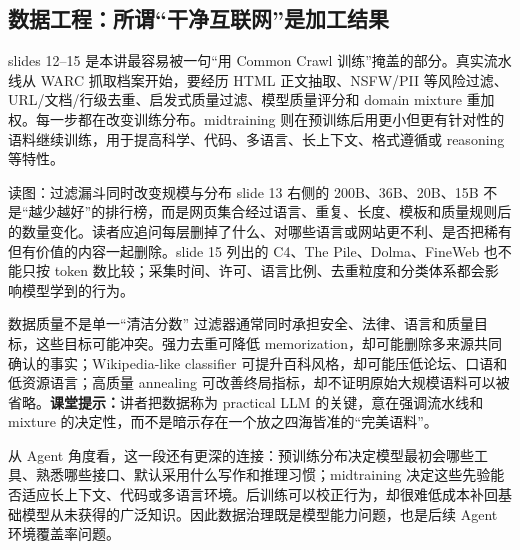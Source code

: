 \subsection{数据工程：所谓“干净互联网”是加工结果}

slides 12--15 是本讲最容易被一句“用 Common Crawl 训练”掩盖的部分。真实流水线从 WARC 抓取档案开始，要经历 HTML 正文抽取、NSFW/PII 等风险过滤、URL/文档/行级去重、启发式质量过滤、模型质量评分和 domain mixture 重加权。每一步都在改变训练分布。midtraining 则在预训练后用更小但更有针对性的语料继续训练，用于提高科学、代码、多语言、长上下文、格式遵循或 reasoning 等特性。


\begin{knowledgebox}{读图：过滤漏斗同时改变规模与分布}
slide 13 右侧的 200B、36B、20B、15B 不是“越少越好”的排行榜，而是网页集合经过语言、重复、长度、模板和质量规则后的数量变化。读者应追问每层删掉了什么、对哪些语言或网站更不利、是否把稀有但有价值的内容一起删除。slide 15 列出的 C4、The Pile、Dolma、FineWeb 也不能只按 token 数比较；采集时间、许可、语言比例、去重粒度和分类体系都会影响模型学到的行为。
\end{knowledgebox}

\begin{warningbox}{数据质量不是单一“清洁分数”}
过滤器通常同时承担安全、法律、语言和质量目标，这些目标可能冲突。强力去重可降低 memorization，却可能删除多来源共同确认的事实；Wikipedia-like classifier 可提升百科风格，却可能压低论坛、口语和低资源语言；高质量 annealing 可改善终局指标，却不证明原始大规模语料可以被省略。\textbf{课堂提示：}讲者把数据称为 practical LLM 的关键，意在强调流水线和 mixture 的决定性，而不是暗示存在一个放之四海皆准的“完美语料”。
\end{warningbox}

从 Agent 角度看，这一段还有更深的连接：预训练分布决定模型最初会哪些工具、熟悉哪些接口、默认采用什么写作和推理习惯；midtraining 决定这些先验能否适应长上下文、代码或多语言环境。后训练可以校正行为，却很难低成本补回基础模型从未获得的广泛知识。因此数据治理既是模型能力问题，也是后续 Agent 环境覆盖率问题。

